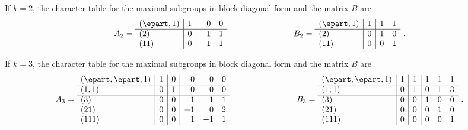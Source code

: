 \begin{example} \label{Ex:firstfactorization}
If $k = 2$, the character table for the maximal
subgroups in block diagonal form and the matrix
$B$ are
$$
A_2 = \begin{array}{l|r|rr}
(\epart,1) & 1 & 0 & 0\\
\hline
(2) & 0 & 1 & 1\\
(11) & 0 & -1 & 1
\end{array}
\qquad\qquad\qquad\qquad
B_2 = \begin{array}{l|r|rr}
(\epart,1) & 1 & 1 & 1\\
\hline
(2) & 0 & 1 & 0\\
(11) & 0 & 0 & 1
\end{array}~.
$$

If $k = 3$, the character table for the maximal
subgroups in block diagonal form and the matrix
$B$ are
$$
A_3 = \begin{array}{l|r|r|rrr}
(\epart, \epart, 1) & 1 & 0 & 0 & 0 & 0\\
\hline
(1, 1) & 0 & 1 & 0 & 0 & 0\\
\hline
(3) & 0 & 0 & 1 & 1 & 1\\
(21) & 0 & 0 & -1 & 0 & 2\\
(111) & 0 & 0 & 1 & -1 & 1
\end{array}
\qquad\qquad\qquad\qquad
B_3 = \begin{array}{l|r|r|rrr}
(\epart, \epart, 1) & 1 & 1 & 1 & 1 & 1\\
\hline
(1, 1) & 0 & 1 & 0 & 1 & 3\\
\hline
(3) & 0 & 0 & 1 & 0 & 0\\
(21) & 0 & 0 & 0 & 1 & 0\\
(111) & 0 & 0 & 0 & 0 & 1
\end{array}~.
$$


\end{example}
